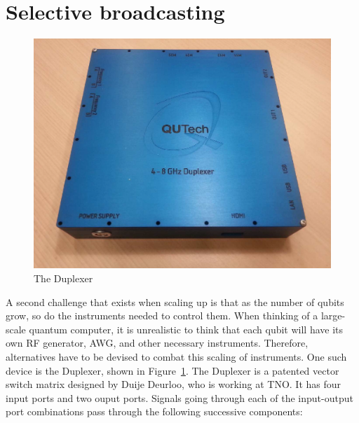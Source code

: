     \section{Selective broadcasting}
      \label{sec:selective broadcasting using the Duplexer}
      \begin{figure}
        \begin{center}
        \vspace{-30pt}
          \includegraphics[width=\textwidth]{../Figures/Duplexer_with_background.png}
        \end{center}
        \vspace{-5pt}
        \caption{The Duplexer}
        \label{fig:Duplexer picture}
        \vspace{-10pt}
      \end{figure}

      A second challenge that exists when scaling up is that as the number of qubits grow, so do the instruments needed to control them. When thinking of a large-scale quantum computer, it is unrealistic to think that each qubit will have its own RF generator, AWG, and other necessary instruments. Therefore, alternatives have to be devised to combat this scaling of instruments. One such device is the Duplexer, shown in Figure~\ref{fig:Duplexer picture}. The Duplexer is a patented vector switch matrix designed by Duije Deurloo, who is working at TNO. It has four input ports and two ouput ports. Signals going through each of the input-output port combinations pass through the following successive components:

